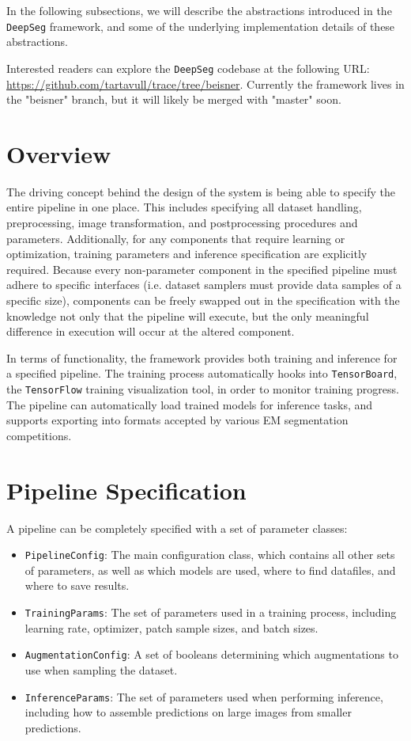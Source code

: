 In the following subsections, we will describe the abstractions introduced in the \texttt{DeepSeg} framework, and some of the underlying implementation details of these abstractions.

Interested readers can explore the \texttt{DeepSeg} codebase at the following URL: \url{https://github.com/tartavull/trace/tree/beisner}. Currently the framework lives in the "beisner" branch, but it will likely be merged with "master" soon.

\section{Overview}

The driving concept behind the design of the system is being able to specify the entire pipeline in one place. This includes specifying all dataset handling, preprocessing, image transformation, and postprocessing procedures and parameters. Additionally, for any components that require learning or optimization, training parameters and inference specification are explicitly required. Because every non-parameter component in the specified pipeline must adhere to specific interfaces (i.e. dataset samplers must provide data samples of a specific size), components can be freely swapped out in the specification with the knowledge not only that the pipeline will execute, but the only meaningful difference in execution will occur at the altered component.

In terms of functionality, the framework provides both training and inference for a specified pipeline. The training process automatically hooks into \texttt{TensorBoard}, the \texttt{TensorFlow} training visualization tool, in order to monitor training progress. The pipeline can automatically load trained models for inference tasks, and supports exporting into formats accepted by various EM segmentation competitions.

\section{Pipeline Specification}

A pipeline can be completely specified with a set of parameter classes:

\begin{itemize}
\item \texttt{PipelineConfig}: The main configuration class, which contains all other sets of parameters, as well as which models are used, where to find datafiles, and where to save results.
\item \texttt{TrainingParams}: The set of parameters used in a training process, including learning rate, optimizer, patch sample sizes, and batch sizes.
\item \texttt{AugmentationConfig}: A set of booleans determining which augmentations to use when sampling the dataset.
\item \texttt{InferenceParams}: The set of parameters used when performing inference, including how to assemble predictions on large images from smaller predictions.
\end{itemize}

